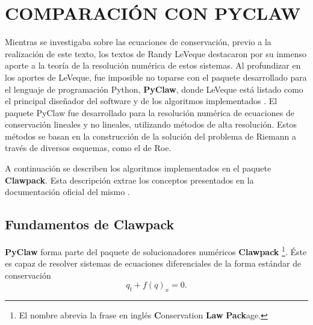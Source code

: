 \chapter{COMPARACIÓN CON PYCLAW}
Mientras se investigaba sobre las ecuaciones de conservación, previo a la realización de este texto, los textos de Randy LeVeque destacaron por su inmenso aporte a la teoría de la resolución numérica de estos sistemas. Al profundizar en los aportes de LeVeque, fue imposible no toparse con el paquete desarrollado para el lenguaje de programación Python, \textbf{PyClaw}, donde LeVeque está listado como el principal diseñador del software y de los algoritmos implementados \cite{clawpack}. El paquete PyClaw fue desarrollado para la resolución numérica de ecuaciones de conservación lineales y no lineales, utilizando métodos de alta resolución. Estos métodos se basan en la construcción de la solución del problema de Riemann a través de diversos esquemas, como el de Roe.

A continuación se describen los algoritmos implementados en el paquete \textbf{Clawpack}. Esta descripción extrae los conceptos presentados en la documentación oficial del mismo \cite{clawpack}.

\section{Fundamentos de Clawpack}
\textbf{PyClaw} forma parte del paquete de solucionadores numéricos \textbf{Clawpack} \footnote{El nombre abrevia la frase en inglés \textbf{C}onservation \textbf{Law} \textbf{Pack}age.}. Éste es capaz de resolver sistemas de ecuaciones diferenciales de la forma estándar de conservación
\begin{equation}
	q_t + f(q)_x = 0.
\end{equation}

